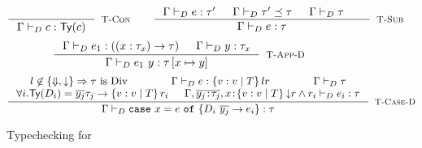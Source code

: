 \begin{figure}[t!]
{$$
\inference{
}{
	\dechastype{\Gamma}{c}{\constty{c}}
}[\rtconst]
\qquad
\inference{
	\dechastype{\Gamma}{e}{\tau'} &&
	\decissubtype{\Gamma}{\tau'}{\tau} &&
	\deciswellformed{\Gamma}{\tau} &&
}{
	\dechastype{\Gamma}{e}{\tau}
}[\rtsub]
$$}
$$
\samerule{
\inference{
	\dechastype{\Gamma, x\colon\tau_x}{e}{\tau} &&
	\deciswellformed{\Gamma}{\tau_x}
}{
	\dechastype{\Gamma}{\efun{x}{e}}{(\tfun{x}{\tau_x}{\tau})}
}[\rtfun]
\qquad}
\inference{
	\dechastype{\Gamma}{e_1}{(\tfunref{x}{\tau_{x}}{\tau}{v}{e_v})} &&
	\dechastype{\Gamma}{\restrictdecidable{y}{e_2}}{\tau_{x}}
}{
	\dechastype{\Gamma}{\eapp{e_1}{\restrictdecidable{y}{e_2}}}{\tau\sub{x}{\restrictdecidable{y}{e_2}}}
}[\rtapp-D]
$$
$$\inference{
	l \not \in \{\finite, \trivial\} \Rightarrow \tau \ \text{is}\ \Div &&
	\dechastype{\Gamma}{e}{\tref{v}{T}{l}{r}} &&
	 \deciswellformed{\Gamma}{\tau}\\
	\forall i. \constty{D_i} = \overline{y_j}{\tau_j} \rightarrow \tref{v}{T}{}{r_i} &&
	\dechastype{\Gamma,  \overline{\tbind{y_j}{\tau_j}},
				\tbind{x}{\tref{v}{T}{\restrictdecidable{\trivial}
				{\ltrivial}
				}{r \land r_i}}}{e_i}{\tau}	
}{
	\dechastype{\Gamma}{\ecase{e}{D_i}{\overline{y_j}}{e_i}{x}}{\tau}
}[\rtcased]$$
\caption{Typechecking for \declang}
\label{fig:declang:typing}
\end{figure}

